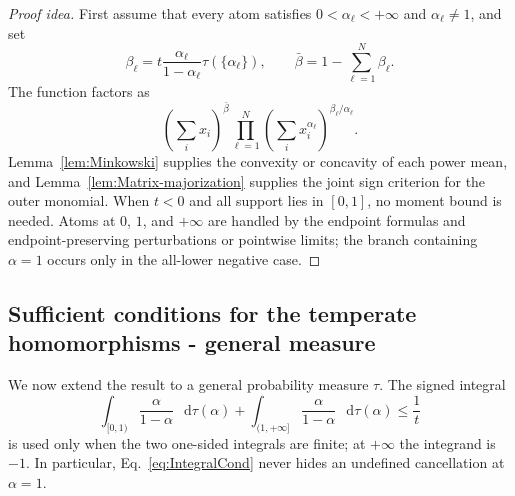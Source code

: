 \documentclass[11pt]{article}
\theoremstyle{definition}
\def\d{\mathop{}\!\mathrm{d}}
\begin{document}
\begin{proof}[Proof idea]
First assume that every atom satisfies
$0<\alpha_\ell<+\infty$ and $\alpha_\ell\neq1$, and set
\begin{equation}
\beta_\ell=t\frac{\alpha_\ell}{1-\alpha_\ell}
\tau(\{\alpha_\ell\}),
\qquad
\bar\beta=1-\sum_{\ell=1}^N\beta_\ell.
\end{equation}
The function factors as
\begin{equation}
\left(\sum_i x_i\right)^{\bar\beta}
\prod_{\ell=1}^N
\left(\sum_i x_i^{\alpha_\ell}\right)^{\beta_\ell/\alpha_\ell}.
\end{equation}
Lemma~\ref{lem:Minkowski} supplies the convexity or concavity of each power mean,
and Lemma~\ref{lem:Matrix-majorization} supplies the joint sign criterion for the
outer monomial.  When $t<0$ and all support lies in $[0,1]$, no moment bound is
needed.  Atoms at $0$, $1$, and $+\infty$ are handled by the endpoint formulas
and endpoint-preserving perturbations or pointwise limits; the branch containing
$\alpha=1$ occurs only in the all-lower negative case.
\end{proof}

\subsection{Sufficient conditions for the temperate homomorphisms - general measure}

We now extend the result to a general probability measure $\tau$.  The signed
integral
\begin{equation}
\label{eq:IntegralCond}
\int_{[0,1)}\frac{\alpha}{1-\alpha}\,\d\tau(\alpha)
+\int_{(1,+\infty]}\frac{\alpha}{1-\alpha}\,\d\tau(\alpha)
\leq\frac1t
\end{equation}
is used only when the two one-sided integrals are finite; at $+\infty$ the
integrand is $-1$.  In particular, Eq.~\eqref{eq:IntegralCond} never hides an
undefined cancellation at $\alpha=1$.
\end{document}
